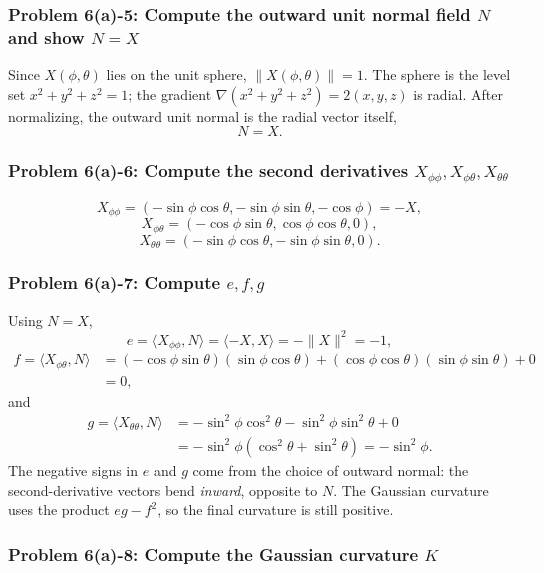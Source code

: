 \documentclass[11pt]{article}
\begin{document}
\subsubsection*{Problem 6(a)-5: Compute the outward unit normal field $N$ and show $N=X$}

Since $X(\phi,\theta)$ lies on the unit sphere, $\|X(\phi,\theta)\|=1$. The sphere is the level set $x^2+y^2+z^2=1$; the gradient $\nabla(x^2+y^2+z^2)=2(x,y,z)$ is radial. After normalizing, the outward unit normal is the radial vector itself,
\[
 N=X.
\]

\subsubsection*{Problem 6(a)-6: Compute the second derivatives $X_{\phi\phi},X_{\phi\theta},X_{\theta\theta}$}

\[
 X_{\phi\phi}
 =
 (-\sin\phi\cos\theta,-\sin\phi\sin\theta,-\cos\phi)
 =
 -X,
\]
\[
 X_{\phi\theta}
 =
 (-\cos\phi\sin\theta,\cos\phi\cos\theta,0),
\]
\[
 X_{\theta\theta}
 =
 (-\sin\phi\cos\theta,-\sin\phi\sin\theta,0).
\]

\subsubsection*{Problem 6(a)-7: Compute $e,f,g$}

Using $N=X$,
\[
 e=\langle X_{\phi\phi},N\rangle=\langle -X,X\rangle=-\|X\|^2=-1,
\]
\[
\begin{aligned}
 f=\langle X_{\phi\theta},N\rangle
 &=(-\cos\phi\sin\theta)(\sin\phi\cos\theta)
 +(\cos\phi\cos\theta)(\sin\phi\sin\theta)+0\\
 &=0,
\end{aligned}
\]
and
\[
\begin{aligned}
 g=\langle X_{\theta\theta},N\rangle
 &=
 -\sin^2\phi\cos^2\theta-\sin^2\phi\sin^2\theta+0\\
 &=
 -\sin^2\phi(\cos^2\theta+\sin^2\theta)
 =-\sin^2\phi.
\end{aligned}
\]
The negative signs in $e$ and $g$ come from the choice of outward normal: the second-derivative vectors bend \emph{inward}, opposite to $N$. The Gaussian curvature uses the product $eg-f^2$, so the final curvature is still positive.

\subsubsection*{Problem 6(a)-8: Compute the Gaussian curvature $K$}
\end{document}
